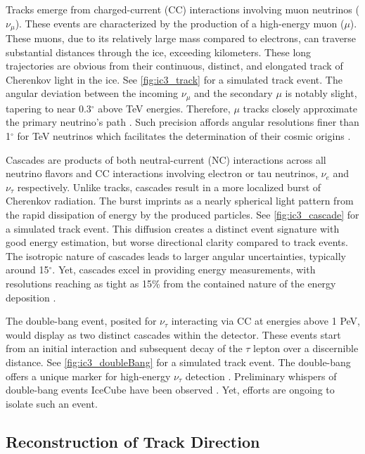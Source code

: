 Tracks emerge from charged-current (CC) interactions involving muon neutrinos ($\nu_\mu$).
These events are characterized by the production of a high-energy muon ($\mu$).
These muons, due to its relatively large mass compared to electrons, can traverse substantial distances through the ice, exceeding kilometers.
These long trajectories are obvious from their continuous, distinct, and elongated track of Cherenkov light in the ice.
See \cref{fig:ic3_track} for a simulated track event.
The angular deviation between the incoming $\nu_\mu$ and the secondary $\mu$ is notably slight, tapering to near 0.3$^\circ$ above TeV energies.
Therefore, $\mu$ tracks closely approximate the primary neutrino's path \cite{physics_withIC3,IC3_energyReco}.
Such precision affords angular resolutions finer than 1$^\circ$ for TeV neutrinos which facilitates the determination of their cosmic origins \cite{physics_withIC3}.

Cascades are products of both neutral-current (NC) interactions across all neutrino flavors and CC interactions involving electron or tau neutrinos, $\nu_e$ and $\nu_\tau$ respectively.
Unlike tracks, cascades result in a more localized burst of Cherenkov radiation.
The burst imprints as a nearly spherical light pattern from the rapid dissipation of energy by the produced particles.
See \cref{fig:ic3_cascade} for a simulated track event.
This diffusion creates a distinct event signature with good energy estimation, but worse directional clarity compared to track events.
The isotropic nature of cascades leads to larger angular uncertainties, typically around 15$^\circ$.
Yet, cascades excel in providing energy measurements, with resolutions reaching as tight as 15\% from the contained nature of the energy deposition \cite{physics_withIC3,IC3_energyReco}.

The double-bang event, posited for $\nu_\tau$ interacting via CC at energies above 1 PeV, would display as two distinct cascades within the detector.
These events start from an initial interaction and subsequent decay of the $\tau$ lepton over a discernible distance.
See \cref{fig:ic3_doubleBang} for a simulated track event.
The double-bang offers a unique marker for high-energy $\nu_\tau$ detection \cite{physics_withIC3}.
Preliminary whispers of double-bang events IceCube have been observed \cite{IC3_taus}.
Yet, efforts are ongoing to isolate such an event.

\subsection{Reconstruction of Track Direction}

